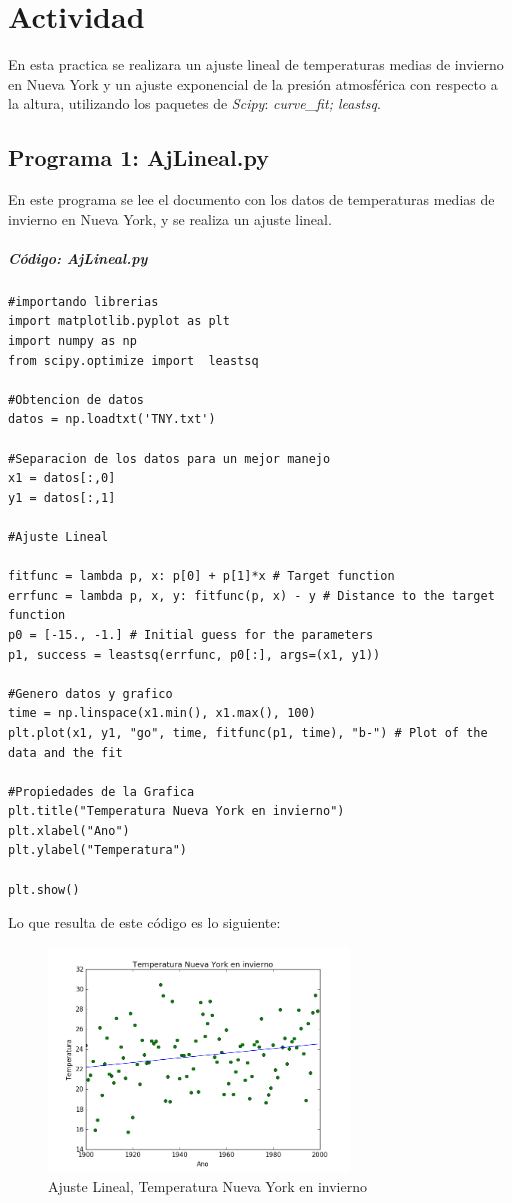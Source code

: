 \documentclass[12pt]{article}
\begin{document}
\section{Actividad}
En esta practica se realizara un ajuste lineal de temperaturas medias de invierno en Nueva York\cite{Da1} y un ajuste exponencial de la presión atmosférica con respecto a la altura\cite{Da2}, utilizando los paquetes de \textit{Scipy}: \textit{curve\_fit; leastsq}.\\

\subsection{Programa 1: AjLineal.py}
En este programa se lee el documento con los datos de temperaturas medias de invierno en Nueva York\cite{Da1}, y se realiza un ajuste lineal.

\subparagraph{Código: AjLineal.py}
\begin{verbatim}
#importando librerias
import matplotlib.pyplot as plt
import numpy as np
from scipy.optimize import  leastsq

#Obtencion de datos
datos = np.loadtxt('TNY.txt')

#Separacion de los datos para un mejor manejo
x1 = datos[:,0]
y1 = datos[:,1] 

#Ajuste Lineal   

fitfunc = lambda p, x: p[0] + p[1]*x # Target function
errfunc = lambda p, x, y: fitfunc(p, x) - y # Distance to the target function
p0 = [-15., -1.] # Initial guess for the parameters
p1, success = leastsq(errfunc, p0[:], args=(x1, y1))

#Genero datos y grafico
time = np.linspace(x1.min(), x1.max(), 100)
plt.plot(x1, y1, "go", time, fitfunc(p1, time), "b-") # Plot of the data and the fit

#Propiedades de la Grafica
plt.title("Temperatura Nueva York en invierno")
plt.xlabel("Ano")
plt.ylabel("Temperatura")

plt.show()
\end{verbatim}
Lo que resulta de este código es lo siguiente:
\begin{figure}[H]
	\centering
	\includegraphics[width=8cm]{AjusteL.png}
	\caption{Ajuste Lineal, Temperatura Nueva York en invierno}
\end{figure}
\end{document}
